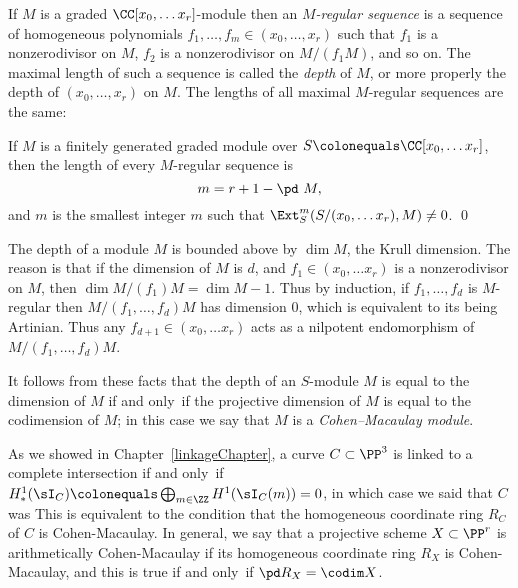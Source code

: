 If $M$ is a graded  $\CC[x_0, \dots x_r]$-module then an \emph{$M$-regular
sequence} is a sequence of homogeneous polynomials
$f_1,\dots,f_m \in (x_0,\dots, x_r)$ such that $f_1$ is a nonzerodivisor
on $M$, $f_2$ is a nonzerodivisor on $M/(f_1M)$, and so on.
The maximal length of such a sequence is called the \emph{depth} of $M$,
%
or more properly the depth of $(x_0,\dots, x_r)$ on $M$.
The lengths of
all maximal $M$-regular sequences
%
are
the same:

\begin{theorem}\label{Auslander--Buchsbaum}
If $M$ is a finitely generated graded module
over $S \colonequals  \CC[x_0, \dots x_r]$,
then the length of every $M$-regular sequence is
$$m = r+1 - \pd\  M,$$
and $m$ is the smallest integer $m$ such that
$\Ext_S^m(S/(x_0, \dots x_r), M) \neq 0$.
%
\qed
\end{theorem}

The depth of a module $M$ is bounded above by $\dim M$, the Krull
dimension. The reason is that if the dimension of $M$
is $d$, and $f_1 \in (x_0, \dots x_r) $ is a nonzerodivisor on $M$,
then $\dim M/(f_1)M= \dim M-1$. Thus by induction, if
$f_1,\dots, f_d$ is $M$-regular then $M/(f_1, \dots, f_d)M$ has
dimension 0, which is equivalent to its being Artinian. Thus any
$ f_{d+1} \in(x_0, \dots x_r) $ acts as a nilpotent endomorphism of
$M/(f_1, \dots, f_d)M$.

It follows from these facts that the depth of an $S$-module $M$ is equal
to the dimension of $M$ if and only~if the projective dimension
of $M$ is equal to the codimension of $M$; in this case we say that $M$
is a
%
\emph{Cohen--Macaulay module}.

As we showed in Chapter~\ref{linkageChapter}, a curve $C\subset \PP^3$
is linked to a complete intersection
if and only~if
$H^1_*(\sI_C) \colonequals  \bigoplus_{m\in \ZZ} H^1(\sI_C(m)) = 0$,
in which case we said that $C$ was
%
This is equivalent to the condition that the homogeneous coordinate
ring $R_{C}$ of $C$ is Cohen-Macaulay.
In general, we say that a projective scheme $X\subset \PP^{r}$
is arithmetically Cohen-Macaulay if its homogeneous coordinate ring $R_{X}$
is Cohen-Macaulay, and this is true
if and only~if $\pd R_X = \codim X$. 


